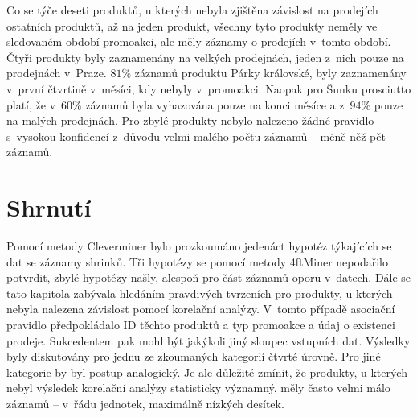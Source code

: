 Co se týče deseti produktů, u kterých nebyla zjištěna závislost na prodejích ostatních produktů, až na jeden produkt, všechny tyto produkty neměly ve sledovaném období promoakci, ale měly záznamy o prodejích v~tomto období. Čtyři produkty byly zaznamenány na velkých prodejnách, jeden z~nich pouze na prodejnách v~Praze. $81\%$ záznamů produktu Párky královské, byly zaznamenány v~první čtvrtině v~měsíci, kdy nebyly v~promoakci. Naopak pro Šunku prosciutto platí, že v~60\% záznamů byla vyhazována pouze na konci měsíce a z~$94\%$ pouze na malých prodejnách. Pro zbylé produkty nebylo nalezeno žádné pravidlo s~vysokou konfidencí z~důvodu velmi malého počtu záznamů -- méně něž pět záznamů.

\section*{Shrnutí}

Pomocí metody Cleverminer bylo prozkoumáno jedenáct hypotéz týkajících se dat se záznamy shrinků. Tři hypotézy se pomocí metody 4ftMiner nepodařilo potvrdit, zbylé hypotézy našly, alespoň pro část záznamů oporu v~datech.
Dále se tato kapitola zabývala hledáním pravdivých tvrzeních pro produkty, u kterých nebyla nalezena závislost pomocí korelační analýzy. V~tomto případě asociační pravidlo předpokládalo ID těchto produktů a typ promoakce a údaj o existenci prodeje. Sukcedentem pak mohl být jakýkoli jiný sloupec vstupních dat. Výsledky byly diskutovány pro jednu ze zkoumaných kategorií čtvrté úrovně. Pro jiné kategorie by byl postup analogický.
Je ale důležité zmínit, že produkty, u kterých nebyl výsledek korelační analýzy statisticky významný, měly často velmi málo záznamů -- v~řádu jednotek, maximálně nízkých desítek.



